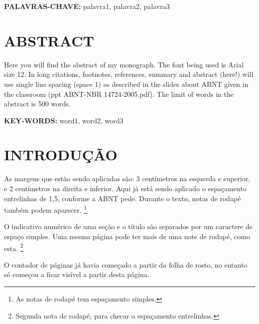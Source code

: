 \documentclass[12pt,a4paper]{article}
\begin{document}
	\vspace{0.8cm}
	\textbf{PALAVRAS-CHAVE:} palavra1, palavra2, palavra3

\onehalfspacing

\clearpage %
\thispagestyle{empty} %
\section*{\hfil ABSTRACT} %
	\singlespace
	Here you will find the abstract of my monograph.
	The font being used is Arial size 12.
	In long citations, footnotes, references, summary and abstract (here!) will use single line spacing (space 1) as described in the slides about ABNT given in the classroom (ppt ABNT-NBR 14724-2005.pdf).
	The limit of words in the abstract is 500 words.
	
	\vspace{0.8cm}
	\textbf{KEY-WORDS:} word1, word2, word3

\onehalfspacing

\clearpage %
\thispagestyle{empty} %
\listoffigures %

\clearpage %
\thispagestyle{empty} %
\listoftables %

\clearpage %
\thispagestyle{empty} %
\tableofcontents %

\clearpage %
\section{INTRODUÇÃO}
	As margens que estão sendo aplicadas são: 3 centímetros na esquerda e superior, e 2 centímetros na direita e inferior.
	Aqui já está sendo aplicado o espaçamento entrelinhas de 1,5, conforme a ABNT pede.
	Durante o texto, notas de rodapé também podem aparecer.
	\footnote{As notas de rodapé tem espaçamento simples.}
	
	O indicativo numérico de uma seção e o título são separados por um caractere de espaço simples.
	Uma mesma página pode ter mais de uma note de rodapé, como esta.
	\footnote{Segunda nota de rodapé, para checar o espaçamento entrelinhas.}
	
	O contador de páginas já havia começado a partir da folha de rosto, no entanto só começou a ficar visível a partir desta página.	
	
\end{document}
